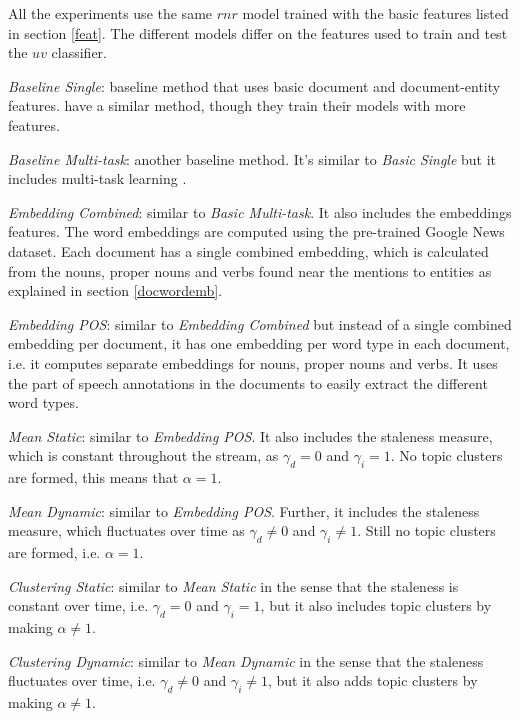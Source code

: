 \documentclass{article}
\begin{document}
All the experiments use the same $rnr$ model trained with the basic features listed in section \ref{feat}. 
The different models differ on the features used to train and test the $uv$ classifier.

\begin{itemize*}
  \item {\textit{Baseline Single}}: baseline method that uses basic document and document-entity features. \citet{jingang13, bellogin13} have a similar method, though they train their models with more features.
  \item {\textit{Baseline Multi-task}}: another baseline method. It's similar to {\textit{Basic Single}} but it includes multi-task learning \cite{Caruana93multitasklearning}.
  \item {\textit{Embedding Combined}}: similar to {\textit{Basic Multi-task}}. It also includes the embeddings features. The word embeddings are computed using the pre-trained Google News dataset. Each document has a single combined embedding, which is calculated from the nouns, proper nouns and verbs found near the mentions to entities as explained in section \ref{docwordemb}.
  \item {\textit{Embedding POS}}: similar to {\textit{Embedding Combined}} but instead of a single combined embedding per document, it has one embedding per word type in each document, i.e. it computes separate embeddings for nouns, proper nouns and verbs. It uses the part of speech annotations in the documents to easily extract the different word types.
  \item {\textit{Mean Static}}: similar to {\textit{Embedding POS}}. It also includes the staleness measure, which is constant throughout the stream, as $\gamma_d = 0$ and $\gamma_i = 1$. No topic clusters are formed, this means that $\alpha = 1$.
  \item {\textit{Mean Dynamic}}: similar to {\textit{Embedding POS}}. Further, it includes the staleness measure, which fluctuates over time as $\gamma_d \neq 0$ and $\gamma_i \neq 1$. Still no topic clusters are formed, i.e. $\alpha = 1$.
  \item {\textit{Clustering Static}}: similar to {\textit{Mean Static}} in the sense that the staleness is constant over time, i.e. $\gamma_d = 0$ and $\gamma_i = 1$, but it also includes topic clusters by making $\alpha \neq 1$.
  \item {\textit{Clustering Dynamic}}: similar to {\textit{Mean Dynamic}} in the sense that the staleness fluctuates over time, i.e. $\gamma_d \neq 0$ and $\gamma_i \neq 1$, but it also adds topic clusters by making $\alpha \neq 1$.
\end{itemize*}
\end{document}
